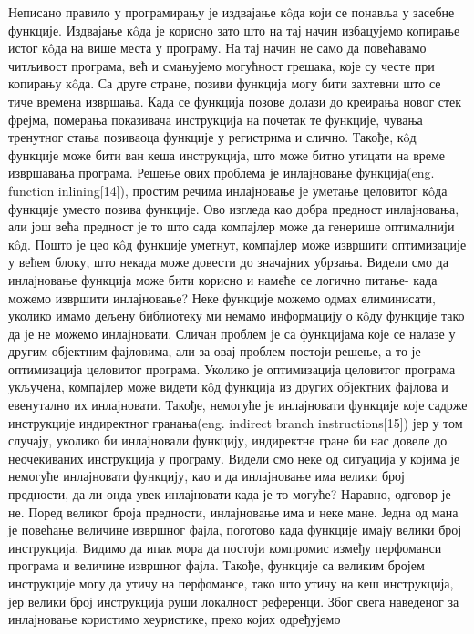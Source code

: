 \documentclass[12pt,oneside]{memoir}
\begin{document}
Неписано правило у програмирању је издвајање к\^{o}да који се понавља у 
засебне функције.
Издвајање к\^{o}да је корисно зато што на тај начин избацујемо копирање
истог к\^{o}да на више места у програму.
На тај начин не само да повећавамо читљивост програма, већ и смањујемо
могућност грешака, које су честе при копирању  к\^{o}да.
Са друге стране, позиви функција могу бити захтевни што се тиче времена извршања.
Када се функција позове долази до креирања новог стек фрејма, померања показивача
инструкција на почетак те функције, чувања тренутног стања позиваоца функције у 
регистрима и слично.
Такође,  к\^{o}д функције може бити ван кеша инструкција, што може битно
утицати на време извршавања програма.
Решење ових проблема је инлајновање функција(eng. function inlining[14]), простим
речима инлајновање је уметање целовитог к\^{o}да функције уместо позива функције.
Ово изгледа као добра предност инлајновања, али још већа предност је то што 
сада компајлер може да генерише оптималнији  к\^{o}д.
Пошто је цео к\^{o}д функције уметнут, компајлер може извршити оптимизације у већем
блоку, што некада може довести до значајних убрзања.
Видели смо да инлајновање функција може бити корисно и намеће се логично питање-
када можемо извршити инлајновање?
Неке функције можемо одмах елиминисати, уколико имамо дељену библиотеку ми немамо
информацију о к\^{o}ду функције тако да је не можемо инлајновати.
Сличан проблем је са функцијама које се налазе у другим објектним фајловима, али за
овај проблем постоји решење, а то је оптимизација целовитог програма.
Уколико је оптимизација целовитог програма укључена, компајлер може видети
к\^{o}д функција из других објектних фајлова и евенутално их инлајновати.
Такође, немогуће је инлајновати функције које садрже инструкције индиректног
гранања(eng. indirect branch instructions[15]) јер у том случају, уколико би 
инлајновали функцију, индиректне гране би нас довеле до неочекиваних инструкција
у програму.
Видели смо неке од ситуација у којима је немогуће инлајновати функцију, као и да
инлајновање има велики број предности, да ли онда увек инлајновати када је то 
могуће?
Наравно, одговор је не. 
Поред великог броја предности, инлајновање има и неке мане.
Једна од мана је повећање величине извршног фајла, поготово када функције имају
велики број инструкција.
Видимо да ипак мора да постоји компромис између перфоманси програма и величине
извршног фајла.
Такође, функције са великим бројем инструкције могу да утичу на перфомансе, тако
што утичу на кеш инструкција, јер велики број инструкција руши локалност референци.
Због свега наведеног за инлајновање користимо хеуристике, преко којих одређујемо
\end{document}
